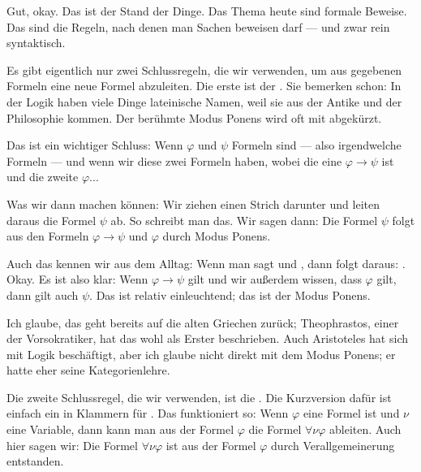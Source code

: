 \begin{spoken-clean}[00:11:28 - 00:13:30]
Gut, okay. Das ist der Stand der Dinge. Das Thema heute sind formale Beweise. Das sind die Regeln, nach denen man Sachen beweisen darf --- und zwar rein syntaktisch. 

Es gibt eigentlich nur zwei Schlussregeln, die wir verwenden, um aus gegebenen Formeln eine neue Formel abzuleiten. Die erste ist der . Sie bemerken schon: In der Logik haben viele Dinge lateinische Namen, weil sie aus der Antike und der Philosophie kommen. Der berühmte Modus Ponens wird oft mit  abgekürzt.

Das ist ein wichtiger Schluss: Wenn $\varphi$ und $\psi$ Formeln sind --- also irgendwelche Formeln --- und wenn wir diese zwei Formeln haben, wobei die eine $\varphi \to \psi$ ist und die zweite $\varphi$...
\end{spoken-clean}

\begin{math-stroke}
\end{math-stroke}

\begin{spoken-clean}[00:13:30 - 00:15:23]
Was wir dann machen können: Wir ziehen einen Strich darunter und leiten daraus die Formel $\psi$ ab. So schreibt man das. Wir sagen dann: Die Formel $\psi$ folgt aus den Formeln $\varphi \to \psi$ und $\varphi$ durch Modus Ponens.

Auch das kennen wir aus dem Alltag: Wenn man sagt  und , dann folgt daraus: . Okay. Es ist also klar: Wenn $\varphi \to \psi$ gilt und wir außerdem wissen, dass $\varphi$ gilt, dann gilt auch $\psi$. Das ist relativ einleuchtend; das ist der Modus Ponens.
\end{spoken-clean}

\begin{spoken-clean}[00:15:23 - 00:17:13]
Ich glaube, das geht bereits auf die alten Griechen zurück; Theophrastos, einer der Vorsokratiker, hat das wohl als Erster beschrieben. Auch Aristoteles hat sich mit Logik beschäftigt, aber ich glaube nicht direkt mit dem Modus Ponens; er hatte eher seine Kategorienlehre.

Die zweite Schlussregel, die wir verwenden, ist die . Die Kurzversion dafür ist einfach ein  in Klammern für . Das funktioniert so: Wenn $\varphi$ eine Formel ist und $\nu$ eine Variable, dann kann man aus der Formel $\varphi$ die Formel $\forall \nu \varphi$ ableiten. Auch hier sagen wir: Die Formel $\forall \nu \varphi$ ist aus der Formel $\varphi$ durch Verallgemeinerung entstanden.
\end{spoken-clean}

